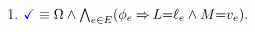 \begin{multicols}{2}
\begin{enumerate}[topsep=0pt,label=(\textsc{w}\arabic*),ref=\textsc{w}\arabic*]
  \item \label {write-term-ca-addr}
    \begin{math}
      \aTerm \riff
      \emptyForm
      \land
      \bigwedge_{\aEv\in\aEvs}\PBR{\aForm_\aEv \limplies \cExp{=}\cVal_\aEv \land\aExp{=}\aVal_\aEv}.
    \end{math}

\end{enumerate}
\end{multicols}
